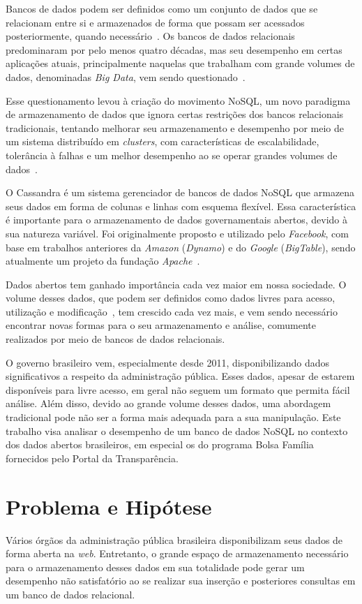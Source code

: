 Bancos de dados podem ser definidos como um conjunto de dados que se relacionam entre si e armazenados de forma que possam ser acessados posteriormente, quando necessário~\cite{cjdate}.
Os bancos de dados relacionais predominaram por pelo menos quatro décadas, mas seu desempenho em certas aplicações atuais, principalmente naquelas que trabalham com grande volumes de dados, denominadas \emph{Big Data}, vem sendo questionado~\cite{pramod}. 

Esse questionamento levou à criação do movimento NoSQL, um novo paradigma de armazenamento de dados que ignora certas restrições dos bancos relacionais tradicionais, tentando melhorar seu armazenamento e desempenho por meio de um sistema distribuído em \emph{clusters}, com características de escalabilidade, tolerância à falhas e um melhor desempenho ao se operar grandes volumes de dados~\cite{pramod}.

O Cassandra é um sistema gerenciador de bancos de dados NoSQL que armazena seus dados em forma de colunas e linhas com esquema flexível. Essa característica é importante para o armazenamento de dados governamentais abertos, devido à sua natureza variável. Foi originalmente proposto e utilizado pelo \emph{Facebook}, com base em trabalhos anteriores da \emph{Amazon} (\emph{Dynamo}) e do \emph{Google} (\emph{BigTable}), sendo atualmente um projeto da fundação \emph{Apache}~\cite{cassandraguide}.

Dados abertos tem ganhado importância cada vez maior em nossa sociedade. O volume desses dados, que podem ser definidos como dados livres para acesso, utilização e modificação~\cite{opendefinition}, tem crescido cada vez mais, e vem sendo necessário encontrar novas formas para o seu armazenamento e análise, comumente realizados por meio de bancos de dados relacionais.

O governo brasileiro vem, especialmente desde 2011, disponibilizando dados significativos a respeito da administração pública. Esses dados, apesar de estarem disponíveis para livre acesso, em geral não seguem um formato que permita fácil análise. Além disso, devido ao grande volume desses dados, uma abordagem tradicional pode não ser a forma mais adequada para a sua manipulação. Este trabalho visa analisar o desempenho de um banco de dados NoSQL no contexto dos dados abertos brasileiros, em especial os do programa Bolsa Família fornecidos pelo Portal da Transparência.

\section{Problema e Hipótese}
Vários órgãos da administração pública brasileira disponibilizam seus dados de forma aberta na \emph{web}. Entretanto, o grande espaço de armazenamento necessário para o armazenamento desses dados em sua totalidade pode gerar um desempenho não satisfatório ao se realizar sua inserção e posteriores consultas em um banco de dados relacional.

